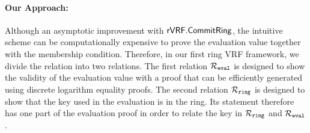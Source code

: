 
%




\paragraph{Our Approach:} Although an asymptotic improvement with $ {\mathsf{rVRF}}.{\mathsf{CommitRing}} $, 
the intuitive scheme can be computationally expensive to prove the evaluation value together with the membership condition. Therefore, in our first ring VRF framework,  we divide the relation into two relations. The first relation $ \mathcal{R}_{\mathtt{eval}} $ is designed  to show the validity of the evaluation value with a proof that can be efficiently generated using discrete logarithm equality proofs.  The second relation $ \mathcal{R}_{\mathtt{ring}} $ is designed to show that the key used in the evaluation is in the ring. Its statement therefore has one part of the evaluation proof in order to relate the key in $ \mathcal{R}_{\mathtt{ring}} $ and $ \mathcal{R}_{\mathtt{eval}} $.


